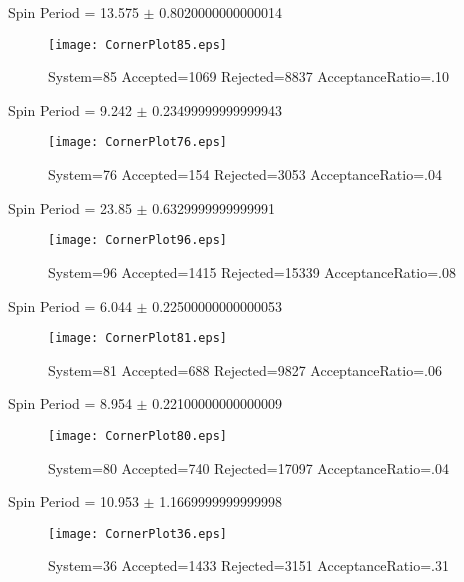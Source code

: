 \documentclass[10pt]{article}
\begin{document}
\listoffigures
\newpage
\begin{center}
        Spin Period = 13.575 $\pm$ 0.8020000000000014
        \end{center}
\begin{figure}[H] 
        \texttt{[image: CornerPlot85.eps]}
        \caption{System=85 Accepted=1069 Rejected=8837 AcceptanceRatio=.10}
        \label{S85}
        \centering
        \end{figure}
\newpage
\begin{center}
        Spin Period = 9.242 $\pm$ 0.23499999999999943
        \end{center}
\begin{figure}[H] 
        \texttt{[image: CornerPlot76.eps]}
        \caption{System=76 Accepted=154 Rejected=3053 AcceptanceRatio=.04}
        \label{S76}
        \centering
        \end{figure}
\newpage
\begin{center}
        Spin Period = 23.85 $\pm$ 0.6329999999999991
        \end{center}
\begin{figure}[H] 
        \texttt{[image: CornerPlot96.eps]}
        \caption{System=96 Accepted=1415 Rejected=15339 AcceptanceRatio=.08}
        \label{S96}
        \centering
        \end{figure}
\newpage
\begin{center}
        Spin Period = 6.044 $\pm$ 0.22500000000000053
        \end{center}
\begin{figure}[H] 
        \texttt{[image: CornerPlot81.eps]}
        \caption{System=81 Accepted=688 Rejected=9827 AcceptanceRatio=.06}
        \label{S81}
        \centering
        \end{figure}
\newpage
\begin{center}
        Spin Period = 8.954 $\pm$ 0.22100000000000009
        \end{center}
\begin{figure}[H] 
        \texttt{[image: CornerPlot80.eps]}
        \caption{System=80 Accepted=740 Rejected=17097 AcceptanceRatio=.04}
        \label{S80}
        \centering
        \end{figure}
\newpage
\begin{center}
        Spin Period = 10.953 $\pm$ 1.1669999999999998
        \end{center}
\begin{figure}[H] 
        \texttt{[image: CornerPlot36.eps]}
        \caption{System=36 Accepted=1433 Rejected=3151 AcceptanceRatio=.31}
        \label{S36}
        \centering
        \end{figure}
\end{document}
